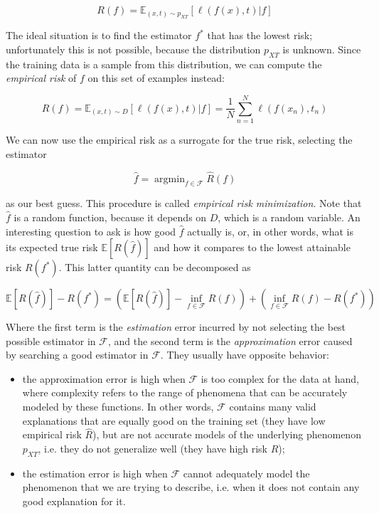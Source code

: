 \documentclass[12pt]{book}
\DeclareMathOperator*{\argmin}{argmin}
\begin{document}
\begin{equation}
R(f)=\mathbb{E}_{(x,t)\sim p_{XT}}\left[\ell(f(x),t) \vert f \right]
\end{equation}

The ideal situation is to find the estimator $f^*$ that has the lowest risk; unfortunately this is not possible, because the distribution $p_{XT}$ is unknown. Since the training data is a sample from this distribution, we can compute the \emph{empirical risk} of $f$ on this set of examples instead:

\begin{equation}
\hat{R}(f)=\mathbb{E}_{(x,t)\sim D}\left[\ell(f(x),t)\vert f\right]=\frac{1}{N}\sum_{n=1}^N \ell(f(x_n),t_n)
\end{equation}

We can now use the empirical risk as a surrogate for the true risk, selecting the estimator

\begin{equation}
\hat{f}=\argmin_{f\in\mathcal{F}}\hat{R}(f)
\end{equation}

as our best guess. This procedure is called \emph{empirical risk minimization}. Note that $\hat{f}$ is a random function, because it depends on $D$, which is a random variable. An interesting question to ask is how good $\hat{f}$ actually is, or, in other words, what is its expected true risk $\mathbb{E}[R(\hat{f})]$ and how it compares to the lowest attainable risk $R(f^*)$. This latter quantity can be decomposed as

\begin{equation}
\mathbb{E}[R(\hat{f})]-R(f^*)=
\left(\mathbb{E}[R(\hat{f})]-\inf_{f\in\mathcal{F}} R(f)\right)
+\left(\inf_{f\in\mathcal{F}} R(f)-R(f^*)\right)
\end{equation}

Where the first term is the \emph{estimation} error incurred by not selecting the best possible estimator in $\mathcal{F}$, and the second term is the \emph{approximation} error caused by searching a good estimator in $\mathcal{F}$. They usually have opposite behavior:

\begin{itemize}
\item the approximation error is high when $\mathcal{F}$ is too complex for the data at hand, where complexity refers to the range of phenomena that can be accurately modeled by these functions. In other words, $\mathcal{F}$ contains many valid explanations that are equally good on the training set (they have low empirical risk $\hat{R}$), but are not accurate models of the underlying phenomenon $p_{XT}$, i.e. they do not generalize well (they have high risk $R$);
\item the estimation error is high when $\mathcal{F}$ cannot adequately model the phenomenon that we are trying to describe, i.e. when it does not contain any good explanation for it.
\end{itemize}
\end{document}
